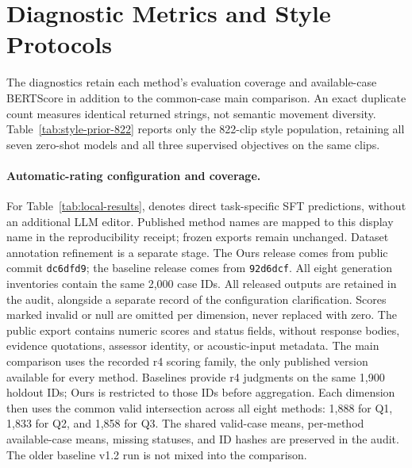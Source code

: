 \section{Diagnostic Metrics and Style Protocols}
\label{sec:experimental-details}

The diagnostics retain each method's evaluation coverage and
available-case BERTScore in addition to the common-case main comparison.
An exact duplicate count measures identical returned strings, not
semantic movement diversity. Table~\ref{tab:style-prior-822} reports
only the 822-clip style population, retaining all seven zero-shot models
and all three supervised objectives on the same clips.

\paragraph{Automatic-rating configuration and coverage.}
For Table~\ref{tab:local-results}, \captioner denotes direct
task-specific SFT predictions, without an additional LLM editor.
Published method names are mapped to this display name in the
reproducibility receipt; frozen exports remain unchanged.
Dataset annotation refinement is a separate stage.
The Ours release comes from public commit \texttt{dc6dfd9}; the baseline
release comes from \texttt{92d6dcf}. All eight generation inventories
contain the same 2,000 case IDs. All released outputs are retained in
the audit, alongside a separate record of the configuration clarification.
Scores marked invalid or null
are omitted per dimension, never replaced with zero. The public export
contains numeric scores and status fields, without response bodies,
evidence quotations, assessor identity, or acoustic-input metadata.
The main comparison uses the recorded r4 scoring family, the only
published version available for every method. Baselines provide r4
judgments on the same 1,900 holdout IDs; Ours is restricted to those
IDs before aggregation. Each dimension then uses the common valid
intersection across all eight methods: 1,888 for Q1, 1,833 for Q2,
and 1,858 for Q3. The shared valid-case means, per-method available-case
means, missing statuses, and ID hashes are preserved in the audit.
The older baseline v1.2 run is not mixed into the comparison.

